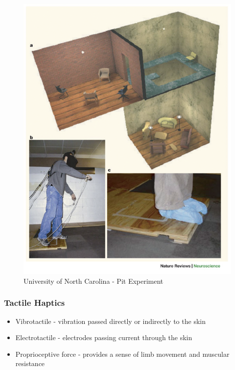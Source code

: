 \begin{frame}
	\begin{figure}
		\includegraphics[scale=0.25]{assets/thepit.png}
		\caption{University of North Carolina - Pit Experiment}
	\end{figure}
\end{frame}

\begin{frame}
	
	\frametitle{Tactile Haptics}
	
	\begin{itemize}
		\item Vibrotactile - vibration passed directly or indirectly to the skin
		\item Electrotactile - electrodes passing current through the skin
		\item Proprioceptive force - provides a sense of limb movement and muscular resistance
	\end{itemize}	
	
\end{frame}

